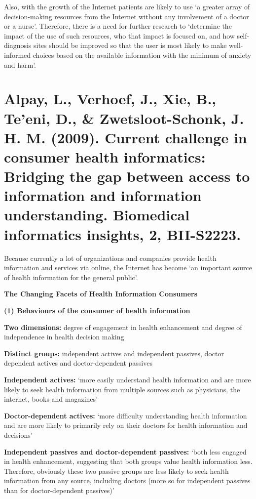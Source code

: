 \documentclass[]{article}
\begin{document}
Also, with the growth of the Internet patients are likely to use ‘a greater array of decision-making resources from the Internet without any involvement of a doctor or a nurse’. Therefore, there is a need for further research to ‘determine the impact of the use of such resources, who that impact is focused on, and how self-diagnosis sites should be improved so that the user is most likely to make well-informed choices based on the available information with the minimum of anxiety and harm’.    

\section{Alpay, L., Verhoef, J., Xie, B., Te'eni, D., \& Zwetsloot-Schonk, J. H. M. (2009). Current challenge in consumer health informatics: Bridging the gap between access to information and information understanding. Biomedical informatics insights, 2, BII-S2223.}

Because currently a lot of organizations and companies provide health information and services via online, the Internet has become ‘an important source of health information for the general public’.  

\textbf{The Changing Facets of Health Information Consumers}

\textbf{(1)	Behaviours of the consumer of health information}

\textbf{Two dimensions:} degree of engagement in health enhancement and degree of independence in health decision making

\textbf{Distinct groups:} independent actives and independent passives, doctor dependent actives and doctor-dependent passives

\textbf{Independent actives:} ‘more easily understand health information and are more likely to seek health information from multiple sources such as physicians, the internet, books and magazines’

\textbf{Doctor-dependent actives:} ‘more difficulty understanding health information and are more likely to primarily rely on their doctors for health information and decisions’

\textbf{Independent passives and doctor-dependent passives:} ‘both less engaged in health enhancement, suggesting that both groups value health information less. Therefore, obviously these two passive groups are less likely to seek health information from any source, including doctors (more so for independent passives than for doctor-dependent passives)’
\end{document}
